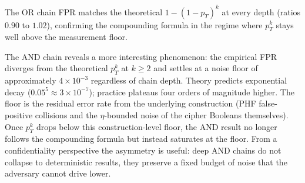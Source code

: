 \documentclass[conference]{IEEEtran}
\theoremstyle{definition}
\theoremstyle{plain}
\theoremstyle{remark}
\begin{document}
\begin{table}[ht]
\centering
\caption{FPR compounding through Boolean chains ($p_T = 0.05$,
$n = 5$ seeds, mean $\pm$ std).  Theoretical FPR is $p_T^k$ (AND)
and $1 - (1 - p_T)^k$ (OR).}
\label{tab:fpr}
\end{table}

The OR chain FPR matches the theoretical $1 - (1 - p_T)^k$ at every
depth (ratios $0.90$ to $1.02$), confirming the compounding formula
in the regime where $p_T^k$ stays well above the measurement floor.

The AND chain reveals a more interesting phenomenon: the empirical
FPR diverges from the theoretical $p_T^k$ at $k \geq 2$ and settles
at a noise floor of approximately $4 \times 10^{-3}$ regardless of
chain depth.  Theory predicts exponential decay
($0.05^5 \approx 3 \times 10^{-7}$); practice plateaus four orders
of magnitude higher.  The floor is the residual error rate from
the underlying construction (PHF false-positive collisions and the
$\eta$-bounded noise of the cipher Booleans themselves).  Once
$p_T^k$ drops below this construction-level floor, the AND result
no longer follows the compounding formula but instead saturates at
the floor.  From a confidentiality perspective the asymmetry is
useful: deep AND chains do not collapse to deterministic results,
they preserve a fixed budget of noise that the adversary cannot
drive lower.
\end{document}
